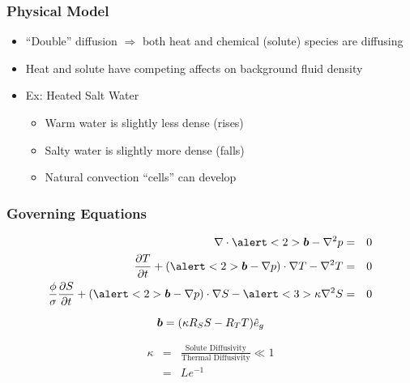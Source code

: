 \begin{frame}
  \frametitle{Physical Model}
      \begin{itemize}
      \item{``Double'' diffusion $\Rightarrow$ both heat and chemical (solute) species are diffusing}
      \item{Heat and solute have competing affects on background fluid density}
      \item{Ex: Heated Salt Water
	\begin{itemize}
	\item{Warm water is slightly less dense (rises)}
	\item{Salty water is slightly more dense (falls)}
	\item{Natural convection ``cells'' can develop }
	\end{itemize}
      }
      \end{itemize}
\end{frame}

\begin{frame}[t]
  \frametitle{Governing Equations}
  \begin{eqnarray}
    \label{eqn:p_strong}
    \nabla \cdot \alert<2>{\bv{b}} - \nabla^2 p &=& 0 \\
    \label{eqn:T_strong}
    \frac{\partial T}{\partial t} +
    \left( \alert<2>{\bv{b}}-\nabla p\right) \cdot \nabla T - \nabla^2{T} &=&0 \\
    \label{eqn:S_strong}
    \frac{\phi}{\sigma} \frac{\partial S}{\partial t} +
    \left( \alert<2>{\bv{b}}-\nabla p\right) \cdot \nabla S -  \alert<3>{\kappa} \nabla^2{S}&=&0 
  \end{eqnarray}

  {
    \begin{equation}
      \nonumber
      {\boldsymbol{b}} = ( \kappa R_S S - R_T T ) \hat{e}_{g}
    \end{equation}
  }

  {
    \begin{eqnarray}
      \nonumber
      \kappa &=& \frac{\text{Solute Diffusivity}}{\text{Thermal Diffusivity}} \ll 1 \\
      \nonumber
      &=& Le^{-1}
    \end{eqnarray}
  }
\end{frame}


